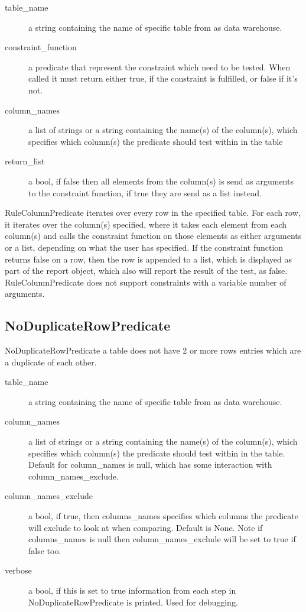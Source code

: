
\begin{description}
\item [table\_name] a string containing the name of specific table from as data warehouse. 
\item [constraint\_function] a predicate that represent the constraint which need to be tested. When called it must return either true, if the constraint is fulfilled, or false if it's not.
\item [column\_names] a list of strings or a string containing the name(s) of the column(s), which specifies which column(s) the predicate should test within in the table
\item [return\_list] a bool, if false then all elements from the column(s) is send as arguments to the constraint function, if true they are send as a list instead.
\end{description}

RuleColumnPredicate iterates over every row in the specified table. For each row, it iterates over the column(s) specified, where it takes each element from each column(s) and calls the constraint function on those elements as either arguments or a list, depending on what the user has specified. If the constraint function returns false on a row, then the row is appended to a list, which is displayed as part of the report object, which also will report the result of the test, as false. RuleColumnPredicate does not support constraints with a variable number of arguments.

\subsection{NoDuplicateRowPredicate}

NoDuplicateRowPredicate a table does not have 2 or more rows entries which are a duplicate of each other. 


\begin{description}
\item [table\_name] a string containing the name of specific table from as data warehouse. 
\item [column\_names] a list of strings or a string containing the name(s) of the column(s), which specifies which column(s) the predicate should test within in the table. Default for column\_names is null, which has some interaction with column\_names\_exclude.
\item [column\_names\_exclude] a bool, if true, then columns\_names specifies which columns the predicate will exclude to look at when comparing. Default is None. Note if columns\_names is null then column\_names\_exclude will be set to true if false too.
\item [verbose] a bool, if this is set to true information from each step in NoDuplicateRowPredicate is printed. Used for debugging.
\end{description}

